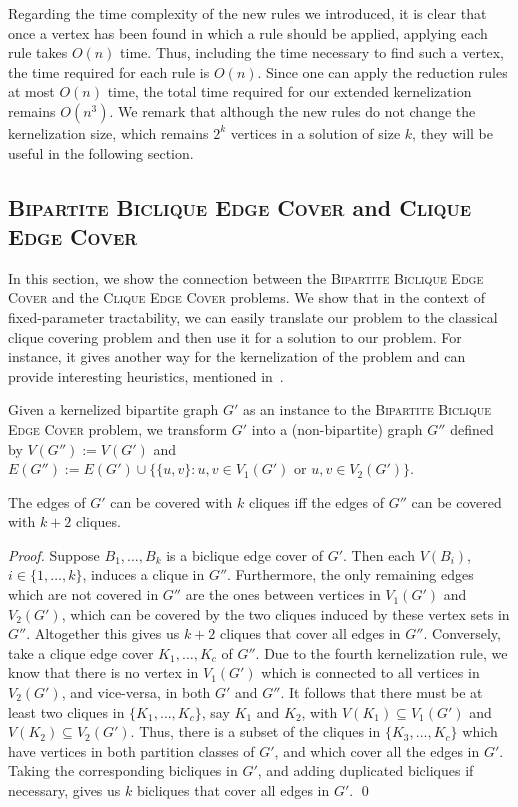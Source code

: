 Regarding the time complexity of the new rules we introduced,
it is clear that once a vertex has been found in which a rule
should be applied, applying each rule takes $O(n)$ time. Thus,
including the time necessary to find such a vertex, the time
required for each rule is $O(n)$. 
Since one can apply the
reduction rules at most $O(n)$ time, the total time required
for our extended kernelization remains $O(n^3)$. We remark that
although 
the new rules do not change the kernelization size, which
remains $2^k$ vertices in a solution of size $k$, they will be
useful in the following section.


\subsection{\textsc{Bipartite Biclique Edge Cover} and \textsc{Clique Edge Cover}}\label{s:ssrbeccec}

In this section, we show the connection between the \textsc{Bipartite Biclique
Edge Cover} and the \textsc{Clique Edge Cover} problems. We show that in the context of
fixed-parameter tractability, we can easily translate our problem to
the classical clique covering problem and then use it for a solution to our problem. For instance, it gives another way for the kernelization of the problem and can provide interesting heuristics, mentioned in~\cite{GrammGuoHuffnerNiedermeier2006}. 

Given a kernelized bipartite graph $G'$ as an instance to the
\textsc{Bipartite Biclique Edge Cover} problem, we transform
$G'$ into a (non-bipartite) graph $G''$ defined by $V(G''):=V(G')$
and $E(G''):=E(G') \cup \{\{u,v\} : u,v \in V_1(G') \textrm{ or }
u,v \in V_2(G')\}$.

\begin{theorem}\label{t:qmqh}
The edges of $G'$ can be covered with $k$ cliques iff the edges
of $G''$ can be covered with $k+2$ cliques.
\end{theorem}

\begin{proof}
Suppose $B_1,\ldots,B_k$ is a biclique edge cover of $G'$. Then
each $V(B_i)$, $i \in \{1,\ldots,k\}$, induces a clique in
$G''$. Furthermore, the only remaining edges which are not
covered in $G''$ are the ones between vertices in $V_1(G')$ and
$V_2(G')$, which can be covered by the two cliques induced by
these vertex sets in $G''$. Altogether this gives us $k+2$
cliques that cover all edges in $G''$. Conversely, take a clique
edge cover $K_1,\ldots,K_c$ of $G''$. Due to the fourth
kernelization rule, we know that there is no vertex in $V_1(G')$
which is connected to all vertices in $V_2(G')$, and vice-versa,
in both $G'$ and $G''$. It follows that there must be at least
two cliques in $\{K_1,\ldots,K_c\}$, say $K_1$ and $K_2$, with
$V(K_1) \subseteq V_1(G')$ and $V(K_2) \subseteq V_2(G')$. Thus,
there is a subset of the cliques in $\{K_3,\ldots,K_c\}$ which
have vertices in both partition classes of $G'$, and which cover
all the edges in $G'$. Taking the corresponding bicliques in
$G'$, and adding duplicated bicliques if necessary, gives us $k$ bicliques
that cover all edges in $G'$. \qed
\end{proof}




